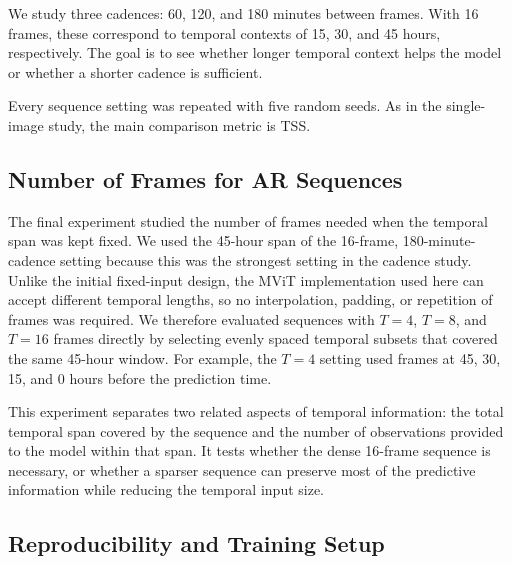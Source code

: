 \documentclass[runningheads]{llncs}
\begin{document}
We study three cadences: 60, 120, and 180 minutes between frames. With 16 frames, these correspond to temporal contexts of 15, 30, and 45 hours, respectively. The goal is to see whether longer temporal context helps the model or whether a shorter cadence is sufficient.

Every sequence setting was repeated with five random seeds. As in the single-image study, the main comparison metric is TSS.

\subsection{Number of Frames for AR Sequences}

The final experiment studied the number of frames needed when the temporal span was kept fixed. We used the 45-hour span of the 16-frame, 180-minute-cadence setting because this was the strongest setting in the cadence study. Unlike the initial fixed-input design, the MViT implementation used here can accept different temporal lengths, so no interpolation, padding, or repetition of frames was required. We therefore evaluated sequences with $T=4$, $T=8$, and $T=16$ frames directly by selecting evenly spaced temporal subsets that covered the same 45-hour window. For example, the $T=4$ setting used frames at 45, 30, 15, and 0 hours before the prediction time.

This experiment separates two related aspects of temporal information: the total temporal span covered by the sequence and the number of observations provided to the model within that span. It tests whether the dense 16-frame sequence is necessary, or whether a sparser sequence can preserve most of the predictive information while reducing the temporal input size.






\subsection{Reproducibility and Training Setup}
\label{sec:repro}
\end{document}
